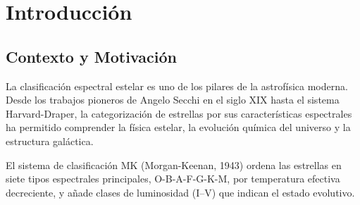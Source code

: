 \documentclass[12pt,a4paper]{article}
\begin{document}
\begin{abstract}
\noindent
Se presenta \textbf{SpectroClass}, un sistema de código abierto para la clasificación
espectral automática de estrellas que integra cuatro métodos independientes mediante
votación ponderada configurable. El sistema procesa espectros en formato TXT y FITS,
normaliza al continuo mediante ajuste local iterativo con rechazo de rayos cósmicos
basado en la desviación absoluta de la mediana (MAD), y mide \textbf{85 líneas
diagnóstico} con ventanas de integración adaptativas. Se calculan \textbf{21 razones
diagnóstico} que cubren la secuencia OBAFGKM completa. La clasificación se realiza
mediante: (1)~un clasificador físico con árbol de decisión de 28 nodos calibrado sobre
estrellas estándar MK, (2)~un árbol de decisión RandomForest entrenado sobre 684
espectros ELODIE, (3)~comparación con plantillas por $\chi^2$ reducido, y
(4)~clasificadores neuronales k-NN y CNN-1D. El sistema de votación ponderada alcanza
una exactitud global del \textbf{86.5\%} sobre el catálogo ELODIE (856 espectros),
superando en $+2.3$ puntos porcentuales al mejor método individual. SpectroClass se
distribuye como aplicación web Flask con interfaz interactiva, exportación CSV/TXT/PDF
y documentación en castellano.
\end{abstract}

\tableofcontents
\newpage

\section{Introducción}

\subsection{Contexto y Motivación}

La clasificación espectral estelar es uno de los pilares de la astrofísica moderna.
Desde los trabajos pioneros de Angelo Secchi en el siglo XIX hasta el sistema
Harvard-Draper, la categorización de estrellas por sus características espectrales ha
permitido comprender la física estelar, la evolución química del universo y la
estructura galáctica.

El sistema de clasificación MK (Morgan-Keenan, 1943) ordena las estrellas en siete
tipos espectrales principales, O-B-A-F-G-K-M, por temperatura efectiva decreciente, y
añade clases de luminosidad (I--V) que indican el estado evolutivo.
\end{document}
